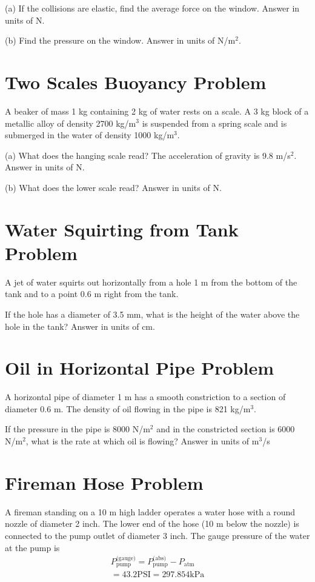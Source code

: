 \documentclass[../physics12.tex]{subfiles}
\begin{document}
(a) If the collisions are elastic, find the average force on the window. Answer in units of N.

(b) Find the pressure on the window. Answer in units of N/m$^2$.

\section{Two Scales Buoyancy Problem}
A beaker of mass 1 kg containing 2 kg of water rests on a scale. A 3 kg block of a metallic alloy of density 2700 kg/m$^3$ is suspended from a spring scale and is submerged in the water of density 1000 kg/m$^3$.

(a) What does the hanging scale read? The acceleration of gravity is 9.8 m/s$^2$. Answer in units of N.

(b) What does the lower scale read? Answer in units of N.

\section{Water Squirting from Tank Problem}
A jet of water squirts out horizontally from a hole 1 m from the bottom of the tank and to a point 0.6 m right from the tank.

If the hole has a diameter of 3.5 mm, what is the height of the water above the hole in the tank? Answer in units of cm.

\section{Oil in Horizontal Pipe Problem}
A horizontal pipe of diameter 1 m has a smooth constriction to a section of diameter 0.6 m. The density of oil flowing in the pipe is 821 kg/m$^3$.

If the pressure in the pipe is 8000 N/m$^2$ and in the constricted section is 6000 N/m$^2$, what is the rate at which oil is flowing? Answer in units of m$^3$/s

\section{Fireman Hose Problem}
A fireman standing on a 10 m high ladder operates a water hose with a round nozzle of diameter 2 inch. The lower end of the hose (10 m below the nozzle) is connected to the pump outlet of diameter 3 inch. 
The gauge pressure of the water at the pump is 
\begin{align*}
    P^{\text{(gauge)}}_{\text{pump}}=P^{\text{(abs)}}_{\text{pump}}-P_{\text{atm}}\\
    = 43.2 \text{PSI} = 297.854 \text{kPa}
\end{align*} 
\end{document}
